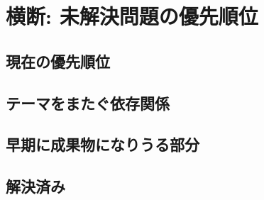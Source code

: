 
\section{横断: 未解決問題の優先順位}

\subsection{現在の優先順位}

\subsection{テーマをまたぐ依存関係}

\subsection{早期に成果物になりうる部分}

\subsection{解決済み}
